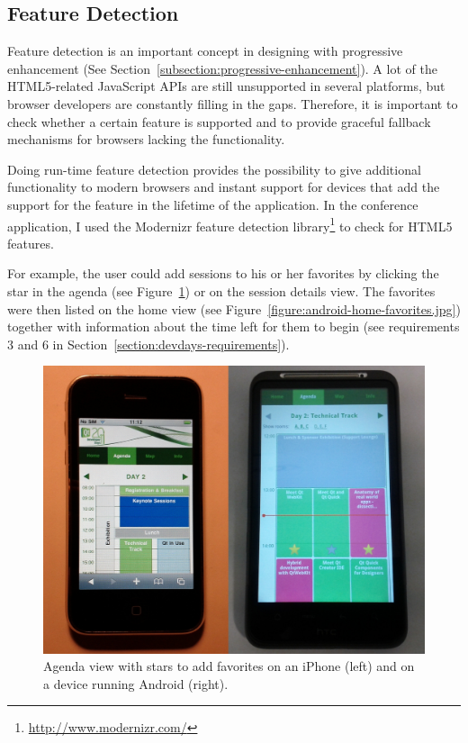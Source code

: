 \subsection{Feature Detection}
\label{section:feature-detection}

Feature detection is an important concept in designing with
progressive enhancement (See
Section~\ref{subsection:progressive-enhancement}). A lot of the
HTML5-related JavaScript APIs are still unsupported in several
platforms, but browser developers are constantly filling in the
gaps. Therefore, it is important to check whether a certain feature is
supported and to provide graceful fallback mechanisms for browsers
lacking the functionality.

Doing run-time feature detection provides the possibility to give
additional functionality to modern browsers and instant support for
devices that add the support for the feature in the lifetime of the
application. In the conference application, I used the Modernizr
feature detection library\footnote{\url{http://www.modernizr.com/}} to
check for HTML5 features.

For example, the user could add sessions to his or her favorites by
clicking the star in the agenda (see
Figure~\ref{figure:iphone-android-agenda.jpg}) or on the session
details view. The favorites were then listed on the home view (see
Figure~\ref{figure:android-home-favorites.jpg}) together with
information about the time left for them to begin (see requirements 3
and 6 in Section~\ref{section:devdays-requirements}).

\begin{figure}[h!]
  \begin{center}
    \includegraphics[width=\textwidth]{images/iphone-android-agenda.jpg}
    \caption{Agenda view with stars to add favorites on an iPhone
      (left) and on a device running Android (right).}
    \label{figure:iphone-android-agenda.jpg}
  \end{center}
\end{figure}


